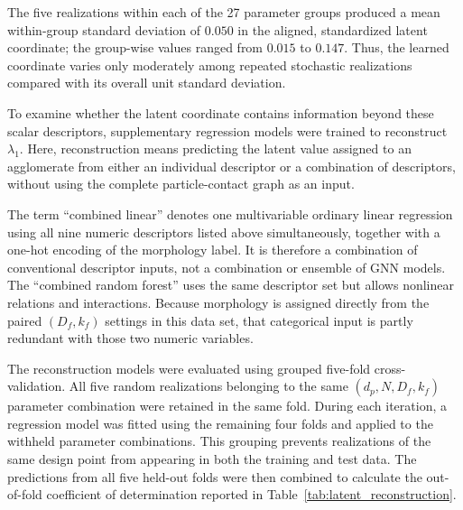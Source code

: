 \documentclass[12pt,a4paper]{article}
\begin{document}
The five realizations within each of the 27 parameter groups produced a mean
within-group standard deviation of $0.050$ in the aligned, standardized latent
coordinate; the group-wise values ranged from $0.015$ to $0.147$. Thus, the
learned coordinate varies only moderately among repeated stochastic
realizations compared with its overall unit standard deviation.

To examine whether the latent coordinate contains information beyond these
scalar descriptors, supplementary regression models were trained to
reconstruct $\lambda_1$. Here, reconstruction means predicting the latent
value assigned to an agglomerate from either an individual descriptor or a
combination of descriptors, without using the complete particle-contact graph
as an input.

The term ``combined linear'' denotes one multivariable ordinary linear
regression using all nine numeric descriptors listed above simultaneously,
together with a one-hot encoding of the morphology label. It is therefore a
combination of conventional descriptor inputs, not a combination or ensemble
of GNN models. The ``combined random forest'' uses the same descriptor set but
allows nonlinear relations and interactions. Because morphology is assigned
directly from the paired $(D_f,k_f)$ settings in this data set, that categorical
input is partly redundant with those two numeric variables.

The reconstruction models were evaluated using grouped five-fold
cross-validation. All five random realizations belonging to the same
$(d_p,N,D_f,k_f)$ parameter combination were retained in the same fold. During
each iteration, a regression model was fitted using the remaining four folds
and applied to the withheld parameter combinations. This grouping prevents
realizations of the same design point from appearing in both the training and
test data. The predictions from all five held-out folds were then combined to
calculate the out-of-fold coefficient of determination reported in
Table~\ref{tab:latent_reconstruction}.
\end{document}
